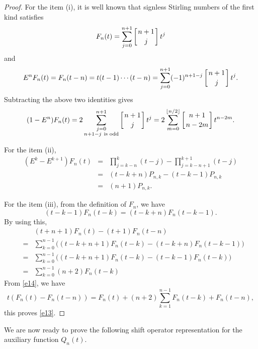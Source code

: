 \documentclass[12pt]{article}
\theoremstyle{definition}
\begin{document}
\begin{proof} For the item (i), it is well known that  signless Stirling numbers of the first kind satisfies
\[F_n(t) = \sum_{j=0}^{n+1} \left[ {n+1 \atop j} \right]t^j \] and
\[E^nF_{n}(t)=F_n(t - n) = t(t - 1) \cdots (t - n) = \sum_{j=0}^{n+1} (-1)^{n+1-j} \left[ {n+1 \atop j} \right] t^j.\]
Subtracting the above two identities gives
$$(1-E^n)F_{n}(t)=2\sum_{\substack{j=0 \\ n+1-j ~\text{is odd}}}^{n+1}\left[ {n+1 \atop j} \right]t^j =2 \sum_{m=0}^{\lfloor n/2 \rfloor} \left[ {n+1 \atop n-2m} \right]  t^{n-2m}.$$

For the item (ii),
\begin{eqnarray*}
(E^k-E^{k+1})F_{n}(t)&=&\prod_{j=k-n}^{k}(t-j)-\prod_{j=k-n+1}^{k+1}(t-j)\\
&=&(t-k+n)P_{n,k}-(t-k-1)P_{n,k}\\
&=&(n+1)P_{n,k}.
\end{eqnarray*}

For the item (iii), from the definition of $F_n$, we have
$$(t-k-1)F_{n}(t-k)=(t-k+n)F_n(t-k-1).$$
By using this,
\begin{eqnarray}\label{e14}
&&(t+n+1)F_{n}(t)-(t+1)F_{n}(t-n)\nonumber\\
&=&\sum_{k=0}^{n-1}\big((t-k+n+1)F_{n}(t-k)-(t-k+n)F_{n}(t-k-1)\big)\nonumber\\
&=&\sum_{k=0}^{n-1}\big((t-k+n+1)F_{n}(t-k)-(t-k-1)F_{n}(t-k)\big)\nonumber\\
&=&\sum_{k=0}^{n-1}(n+2)F_{n}(t-k)
\end{eqnarray}
From \eqref{e14}, we have
$$t\left(F_{n}(t)-F_{n}(t-n)\right)=F_{n}(t)+(n+2)\sum_{k=1}^{n-1}F_{n}(t-k)+F_{n}(t-n),$$ this proves  \eqref{e13}.
\end{proof}

We are now ready to prove the following shift operator representation for the auxiliary function $Q_n(t)$.
\end{document}
